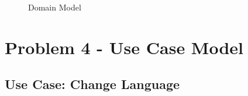 \documentclass[a4paper,12pt]{report}
\begin{document}
\begin{figure}[!htb]
	\centering
	\caption{\label{fig:Domain Model} Domain Model}	
\end{figure}


%
%

\newpage

\section{Problem 4 - Use Case Model}
\subsection{Use Case: Change Language}
 
\end{document}
